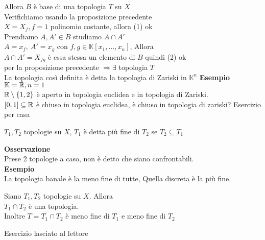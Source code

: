 \documentclass{article}
\begin{document}
Allora $B$ è base di una topologia $T$ su $X$\\
Verifichiamo usando la proposizione precedente\\
 $X = X_f, f = 1$ polinomio costante, allora (1) ok\\
 Prendiamo $A, A'\in B$ studiamo $A\cap A'$\\
 $A = x_f, \ A'=x_g$ con $f,g \in \mathbb K[x_1,\ldots,x_n]$, Allora\\
 $A\cap A' = X_{fg}$ è essa stessa un elemento di $B$ quindi (2) ok \\
 per la proposizione precedente $ \Rightarrow \exists$ topologia $T$\\
 La topologia così definita è detta la topologia di Zariski in  $\mathbb K^n$
	\textbf{Esempio}\\
	$\mathbb{K} = \mathbb{R}, n = 1$\\
	$\mathbb{R}\setminus\{1,2\}$ è aperto in topologia euclidea e in topologia di Zariski.\\
	$[0,1]\subseteq\mathbb{R}$ è chiuso in topologia euclidea, è chiuso in topologia di zariski? Esercizio per casa\\

	\begin{defi}
		$T_1,T_2$ topologie su $X$, $T_1$ è detta più fine di $T_2$ se $T_2\subseteq T_1$
	\end{defi}
	\textbf{Osservazione}\\
	Prese 2 topologie a caso, non è detto che siano confrontabili.\\
	\textbf{Esempio}\\
	La topologia banale è la meno fine di tutte, Quella discreta è la più fine.\\
	\begin{propo}
		Siano $ T_1,T_2$ topologie su $X$. Allora\\
		$T_1\cap T_2$ è una topologia.\\
		Inoltre $T = T_1\cap T_2$ è meno fine di $T_1$ e meno fine di $T_2$
	\end{propo}
	\begin{dimo}
		Esercizio lasciato al lettore
	\end{dimo}


\maketitle
	\newpage
\end{document}
